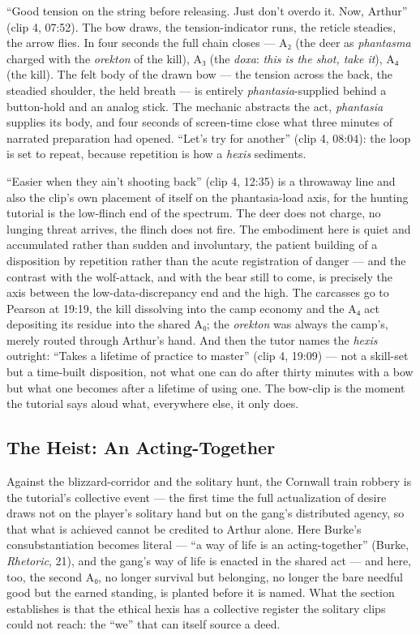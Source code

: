 ``Good tension on the string before releasing. Just don't overdo it. Now, Arthur'' (clip 4, 07:52). The bow draws, the tension-indicator runs, the reticle steadies, the arrow flies. In four seconds the full chain closes — A₂ (the deer as \textit{phantasma} charged with the \textit{orekton} of the kill), A₃ (the \textit{doxa}: \textit{this is the shot, take it}), A₄ (the kill). The felt body of the drawn bow — the tension across the back, the steadied shoulder, the held breath — is entirely \textit{phantasia}-supplied behind a button-hold and an analog stick. The mechanic abstracts the act, \textit{phantasia} supplies its body, and four seconds of screen-time close what three minutes of narrated preparation had opened. ``Let's try for another'' (clip 4, 08:04): the loop is set to repeat, because repetition is how a \textit{hexis} sediments.

``Easier when they ain't shooting back'' (clip 4, 12:35) is a throwaway line and also the clip's own placement of itself on the phantasia-load axis, for the hunting tutorial is the low-flinch end of the spectrum. The deer does not charge, no lunging threat arrives, the flinch does not fire. The embodiment here is quiet and accumulated rather than sudden and involuntary, the patient building of a disposition by repetition rather than the acute registration of danger — and the contrast with the wolf-attack, and with the bear still to come, is precisely the axis between the low-data-discrepancy end and the high. The carcasses go to Pearson at 19:19, the kill dissolving into the camp economy and the A₄ act depositing its residue into the shared A₀; the \textit{orekton} was always the camp's, merely routed through Arthur's hand. And then the tutor names the \textit{hexis} outright: ``Takes a lifetime of practice to master'' (clip 4, 19:09) — not a skill-set but a time-built disposition, not what one can do after thirty minutes with a bow but what one becomes after a lifetime of using one. The bow-clip is the moment the tutorial says aloud what, everywhere else, it only does.

\bigskip

\subsection*{The Heist: An Acting-Together}

Against the blizzard-corridor and the solitary hunt, the Cornwall train robbery is the tutorial's collective event — the first time the full actualization of desire draws not on the player's solitary hand but on the gang's distributed agency, so that what is achieved cannot be credited to Arthur alone. Here Burke's consubstantiation becomes literal — ``a way of life is an acting-together'' (Burke, \textit{Rhetoric}, 21), and the gang's way of life is enacted in the shared act — and here, too, the second A₀, no longer survival but belonging, no longer the bare needful good but the earned standing, is planted before it is named. What the section establishes is that the ethical hexis has a collective register the solitary clips could not reach: the ``we'' that can itself source a deed.

